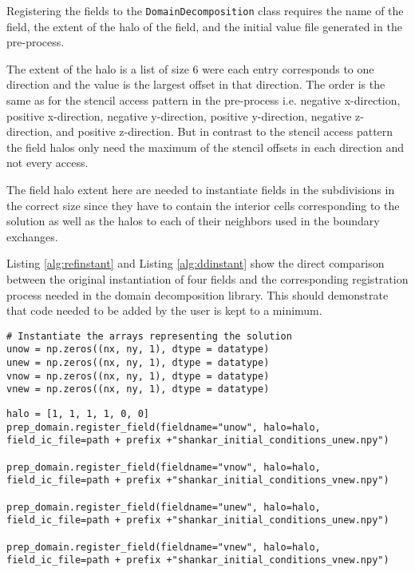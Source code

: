 Registering the fields to the \texttt{DomainDecomposition} class requires the name of the field, the extent of the halo of the field, and the initial value file generated in the pre-process.

The extent of the halo is a list of size 6 were each entry corresponds to one direction and the value is the largest offset in that direction.
The order is the same as for the stencil access pattern in the pre-process i.e. negative x-direction, positive x-direction, negative y-direction, positive y-direction, negative z-direction, and positive z-direction.
But in contrast to the stencil access pattern the field halos only need the maximum of the stencil offsets in each direction and not every access.

The field halo extent here are needed to instantiate fields in the subdivisions in the correct size since they have to contain the interior cells corresponding to the solution as well as the halos to each of their neighbors used in the boundary exchanges.

Listing \ref{alg:refinstant} and Listing \ref{alg:ddinstant} show the direct comparison between the original instantiation of four fields and the corresponding registration process needed in the domain decomposition library.
This should demonstrate that code needed to be added by the user is kept to a minimum.

\begin{lstlisting}[caption={Example code for the original user field instantiation.},captionpos=b, label={alg:refinstant}, float, floatplacement=H]
# Instantiate the arrays representing the solution
unow = np.zeros((nx, ny, 1), dtype = datatype)
unew = np.zeros((nx, ny, 1), dtype = datatype)
vnow = np.zeros((nx, ny, 1), dtype = datatype)
vnew = np.zeros((nx, ny, 1), dtype = datatype)
\end{lstlisting} 

\begin{lstlisting}[caption={Example code for the same field instantiation using the domain decomposition library.},captionpos=b, label={alg:ddinstant}, float, floatplacement=H]
halo = [1, 1, 1, 1, 0, 0]
prep_domain.register_field(fieldname="unow", halo=halo, field_ic_file=path + prefix +"shankar_initial_conditions_unew.npy")

prep_domain.register_field(fieldname="vnow", halo=halo, field_ic_file=path + prefix +"shankar_initial_conditions_vnew.npy")

prep_domain.register_field(fieldname="unew", halo=halo, field_ic_file=path + prefix +"shankar_initial_conditions_unew.npy")

prep_domain.register_field(fieldname="vnew", halo=halo, field_ic_file=path + prefix +"shankar_initial_conditions_vnew.npy")
\end{lstlisting}

